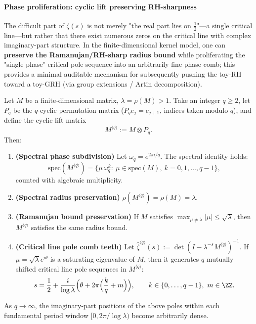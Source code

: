 \paragraph{Phase proliferation: cyclic lift preserving RH-sharpness}
The difficult part of \(\zeta(s)\) is not merely "the real part lies on \(\tfrac12\)"---a single critical line---but rather that there exist numerous zeros on the critical line with complex imaginary-part structure.
In the finite-dimensional kernel model, one can \textbf{preserve the Ramanujan/RH-sharp radius bound} while proliferating the "single phase" critical pole sequence into an arbitrarily fine phase comb; this provides a minimal auditable mechanism for subsequently pushing the toy-RH toward a toy-GRH (via group extensions / Artin decomposition).

\begin{proposition}\label{prop:finite-rh-phase-lift}
Let $M$ be a finite-dimensional matrix, $\lambda=\rho(M)>1$. Take an integer $q\ge 2$, let $P_q$ be the $q$-cyclic permutation matrix ($P_q e_j=e_{j+1}$, indices taken modulo $q$), and define the cyclic lift matrix
\[
M^{\langle q\rangle}:=M\otimes P_q.
\]
Then:
\begin{enumerate}
  \item \textbf{(Spectral phase subdivision)} Let $\omega_q=e^{2\pi i/q}$. The spectral identity holds:
  \[
  \mathrm{spec}(M^{\langle q\rangle})
  =\{\mu\,\omega_q^k:\ \mu\in \mathrm{spec}(M),\ k=0,1,\dots,q-1\},
  \]
  counted with algebraic multiplicity.
  \item \textbf{(Spectral radius preservation)} $\rho(M^{\langle q\rangle})=\rho(M)=\lambda$.
  \item \textbf{(Ramanujan bound preservation)} If $M$ satisfies $\max_{\mu\neq \lambda}|\mu|\le \sqrt{\lambda}$, then $M^{\langle q\rangle}$ satisfies the same radius bound.
  \item \textbf{(Critical line pole comb teeth)} Let
  \(
  \widehat{\zeta}^{\langle q\rangle}(s):=\det(I-\lambda^{-s}M^{\langle q\rangle})^{-1}
  \).
  If $\mu=\sqrt{\lambda}e^{i\theta}$ is a saturating eigenvalue of $M$, then it generates $q$ mutually shifted critical line pole sequences in $M^{\langle q\rangle}$:
  \[
  s=\frac12+\frac{i}{\log\lambda}\Bigl(\theta+2\pi\Bigl(\frac{k}{q}+m\Bigr)\Bigr),
  \qquad k\in\{0,\dots,q-1\},\ m\in\ZZ.
  \]
\end{enumerate}
As $q\to\infty$, the imaginary-part positions of the above poles within each fundamental period window $[0,2\pi/\log\lambda)$ become arbitrarily dense.
\end{proposition}


